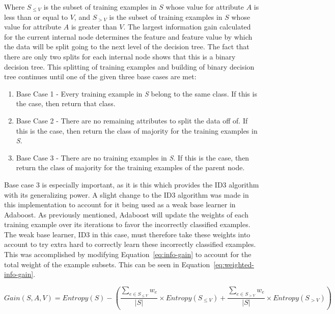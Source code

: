 \documentclass[a4paper]{article}
\begin{document}
Where $S_{\le V}$ is the subset of training examples in $S$ whose value for attribute $A$ is less than or equal to $V$, and $S_{> V}$ is the subset of training examples in $S$ whose value for attribute $A$ is greater than $V$. The largest information gain calculated for the current internal node determines the feature and feature value by which the data will be split going to the next level of the decision tree. The fact that there are only two splits for each internal node shows that this is a binary decision tree. This splitting of training examples and building of binary decision tree continues until one of the given three base cases are met:
\begin{enumerate}
    \item Base Case 1 - Every training example in \textit{S} belong to the same class. If this is the case, then return that class.

    \item Base Case 2 - There are no remaining attributes to split the data off of. If this is the case, then return the class of majority for the training examples in \textit{S}.

    \item Base Case 3 - There are no training examples in \textit{S}. If this is the case, then return the class of majority for the training examples of the parent node.
\end{enumerate}
Base case 3 is especially important, as it is this which provides the ID3 algorithm with its generalizing power. A slight change to the ID3 algorithm was made in this implementation to account for it being used as a weak base learner in Adaboost. As previously mentioned, Adaboost will update the weights of each training example over its iterations to favor the incorrectly classified examples. The weak base learner, ID3 in this case, must therefore take these weights into account to try extra hard to correctly learn these incorrectly classified examples. This was accomplished by modifying Equation~\ref{eq:info-gain} to account for the total weight of the example subsets. This can be seen in Equation~\ref{eq:weighted-info-gain}.

\begin{equation}
    \label{eq:weighted-info-gain}
    Gain(S, A, V) = Entropy(S) - \left(\frac{\sum_{e \in S_{\le V}}w_e}{|S|}\times Entropy(S_{\le V}) + \frac{\sum_{e \in S_{> V}}w_e}{|S|}\times Entropy(S_{> V}) \right)
\end{equation}
\end{document}
